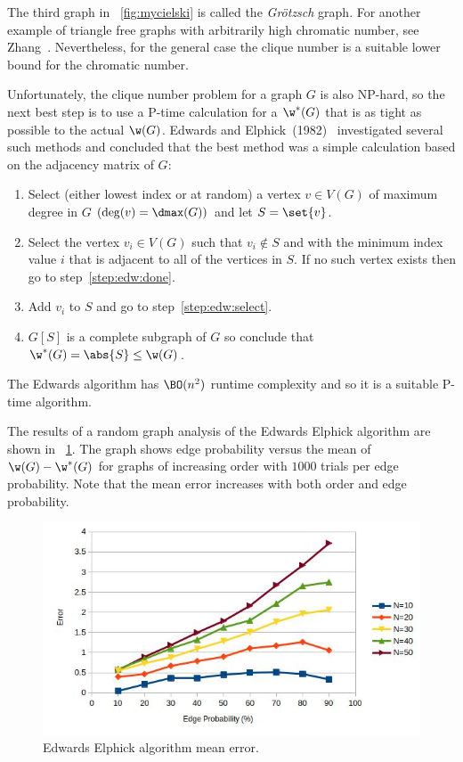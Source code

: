 The third graph in \figurename~\ref{fig:mycielski} is called the \emph{Gr\"otzsch} graph.  For another example of
triangle free graphs with arbitrarily high chromatic number, see Zhang~\cite{zhang}.  Nevertheless, for the general
case the clique number is a suitable lower bound for the chromatic number.

Unfortunately, the clique number problem for a graph \(G\) is also NP-hard, so the next best step is to use a
P-time calculation for a \(\w^*(G)\) that is as tight as possible to the actual \(\w(G)\).  Edwards and
Elphick~(1982)~\cite{edwards} investigated several such methods and concluded that the best method was a simple
calculation based on the adjacency matrix of \(G\):
\begin{enumerate}
\item Select (either lowest index or at random) a vertex \(v\in V(G)\) of maximum degree in \(G\)
  \((\deg(v)=\dmax(G))\) and let \(S=\set{v}\).
\item\label{step:edw:select} Select the vertex \(v_i\in V(G)\) such that \(v_i\notin S\) and with the minimum index
  value \(i\) that is adjacent to all of the vertices in \(S\).  If no such vertex exists then go to
  step~\ref{step:edw:done}.
\item Add \(v_i\) to \(S\) and go to step~\ref{step:edw:select}.
\item\label{step:edw:done} \(G[S]\) is a complete subgraph of \(G\) so conclude that \(\w^*(G)=\abs{S}\le\w(G)\).
\end{enumerate}

The Edwards algorithm has \(\BO(n^2)\) runtime complexity and so it is a suitable P-time algorithm.

The results of a random graph analysis of the Edwards Elphick algorithm are shown in
\figurename~\ref{fig:edwards1err}.  The graph shows edge probability versus the mean of \(\w(G)-\w^*(G)\) for
graphs of increasing order with \(1000\) trials per edge probability.  Note that the mean error increases with both
order and edge probability.

\begin{figure}[H]
  \centering
  \includegraphics[width=5in]{edwards1_error}
  \caption{Edwards Elphick algorithm mean error.}
  \label{fig:edwards1err}
\end{figure}

